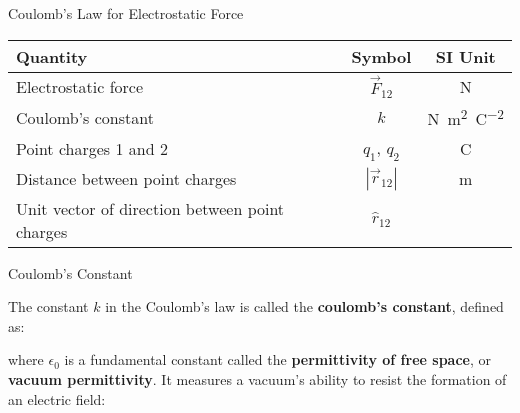 \documentclass[12pt,aspectratio=169]{beamer}
\begin{document}
\begin{frame}{Coulomb's Law for Electrostatic Force}
  \begin{center}
    \begin{tabular}{l|c|c}
      \rowcolor{pink}
      \textbf{Quantity} & \textbf{Symbol} & \textbf{SI Unit} \\ \hline
      Electrostatic force    & $\vec F_{12}$ & \si\newton \\
      Coulomb's constant & $k$ &
      \si{\newton\metre\squared\per\coulomb\squared}\\
      Point charges 1 and 2  & $q_1$, $q_2$ &  \si\coulomb \\
      Distance between point charges & $|\vec r_{12}|$ & \si\metre \\
      Unit vector of direction between point charges & $\hat r_{12}$ &
    \end{tabular}
  \end{center}
\end{frame}



\begin{frame}{Coulomb's Constant}


  The constant $k$ in the Coulomb's law is called the
  \textbf{coulomb's constant}, defined as:


  where $\epsilon_0$ is a fundamental constant called the
  \textbf{permittivity of free space}, or \textbf{vacuum permittivity}. It
  measures a vacuum's ability to resist the formation of an electric field:

\end{frame}
\end{document}
